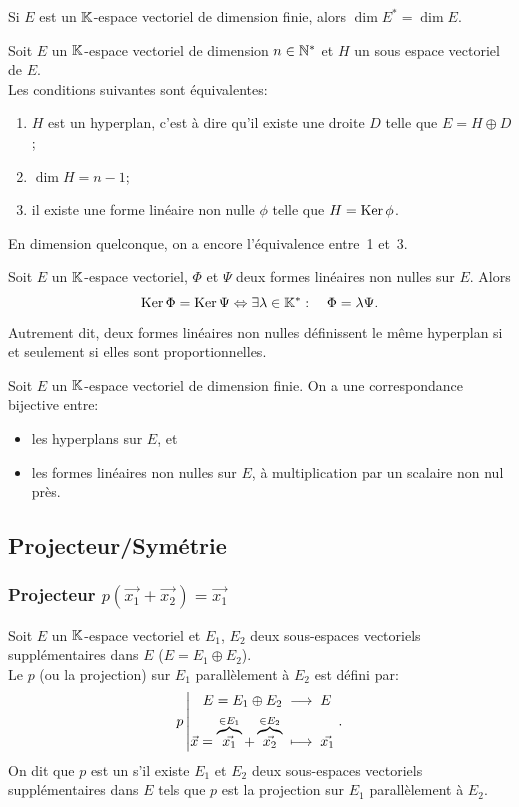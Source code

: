 \documentclass{book}
\begin{document}
\begin{Proposition}[Dimension]
Si $E$ est un $\mathbb{K}$-espace vectoriel de dimension finie, alors $\dim E^* = \dim E$.
\end{Proposition}

\begin{Theoreme}
Soit $E$ un $\mathbb{K}$-espace vectoriel de dimension $n\in\mathbb{N}^*$ et $H$ un sous espace vectoriel de $E$.\\
Les conditions suivantes sont équivalentes:
\begin{enumerate}
\item $H$ est un hyperplan, c'est à dire qu'il existe une droite $D$ telle que $E = H \oplus D$;
\item $\dim H = n - 1$;
\item il existe une forme linéaire non nulle $\phi$ telle que $H = \operatorname{Ker} \phi$.
\end{enumerate}
\end{Theoreme}
\begin{Remarque}
En dimension quelconque, on a encore l'équivalence entre~1 et~3.
\end{Remarque}


\begin{Proposition}
Soit $E$ un $\mathbb{K} $-espace vectoriel, $\Phi $ et $\Psi $ deux formes linéaires non nulles sur $E$.
Alors \[ \operatorname{Ker} \Phi  = \operatorname{Ker} \Psi  \Leftrightarrow \exists  \lambda \in  \mathbb{K}^*:\quad \Phi  = \lambda \Psi . \]
Autrement dit, deux formes linéaires non nulles définissent le même hyperplan si et seulement si elles sont proportionnelles.
\end{Proposition}
\begin{Remarque}
Soit $E$ un $\mathbb{K} $-espace vectoriel de dimension finie.  On a une correspondance bijective entre:
\begin{itemize}
\item les hyperplans sur $E$, et
\item les formes linéaires non nulles sur $E$, à multiplication par un scalaire non nul près.
\end{itemize}
\end{Remarque}

\subsection{Projecteur/Symétrie}
\subsubsection{Projecteur $p(\vec{x_1} + \vec{x_2})=\vec{x_1}$}
\begin{Definition}[Projecteur]
 Soit $E$ un $\mathbb{K} $-espace vectoriel et $E_1$, $E_2$ deux sous-espaces vectoriels supplémentaires dans $E$  ($E = E_1 \oplus E_2$).\\
Le  $p$ (ou la projection) sur $E_1$ parallèlement à $E_2$ est défini par:
$${p}\left|\begin{aligned}{ E = E_1 \oplus E_2 }&\;\longrightarrow\;{ E}\\{\vec{x} = \overbrace{\vec{x_1}}^{\in E_1} + \overbrace{\vec{x_2}}^{\in E_2}}&\;\longmapsto\;{\vec{x_1}}\end{aligned}\right..$$
On dit que $p$ est un  s'il existe $E_1$ et $E_2$ deux sous-espaces vectoriels supplémentaires dans $E$ tels que
$p$ est la projection sur $E_1$ parallèlement à $E_2$.
\end{Definition}
\end{document}
